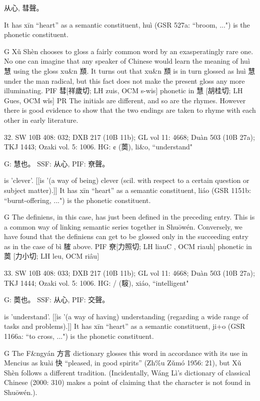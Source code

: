 从心, 彗聲。

It has xīn ``heart'' as a semantic constituent,
huì (GSR 527a: ``broom, ...") is the phonetic constituent.

G Xǔ Shèn chooses to gloss a fairly common word by an exasperatingly rare one. No one can imagine that any speaker of Chinese would learn the meaning of huì 慧 using the gloss xu&n 䫞. It turns out that xu&n 䫞 is in turn glossed as huì 慧 under the man radical, but this fact does not make the present gloss any more illuminating.
PIF    彗[祥歲切; LH zuis, OCM s-wis] phonetic in 慧 [胡桂切; LH Gues, OCM wǐs]
PR The initials are different, and so are the rhymes. However there is good evidence to show that the two endings are taken to rhyme with each other in early literature.

32. SW 10B 408: 032; DXB 217 (10B 11b); GL vol 11: 4668; Duàn 503 (10B 27a); TKJ 1443; Ozaki vol. 5: 1006.
HG: ¢ (䓴), li&o, ``understand"

G:	慧也。
SSF: 从心,
PIF: 尞聲。

is 'clever'. [[is '(a way of being) clever (scil. with respect to a certain question or subject matter).]]
It has xīn ``heart'' as a semantic constituent,
liáo (GSR 1151b: ``burnt-offering, ...") is the phonetic constituent.

G The definiens, in this case, has just been defined in the preceding entry. This is a common way of linking semantic series together in Shuōwén. Conversely, we have found that the definiens can get to be glossed only in the succeeding entry as in the case of bì 䮤 above.
PIF    尞[力照切; LH liauC , OCM riauh] phonetic in 䓴 [力小切; LH leu, OCM riâu]

33. SW 10B 408: 033; DXB 217 (10B 11b); GL vol 11: 4668; Duàn 503 (10B 27a); TKJ 1444; Ozaki vol. 5: 1006.
HG:  / (䮟), xiáo, ``intelligent"

G:	䓴也。
SSF: 从心,
PIF: 交聲。

is 'understand'. [[is '(a way of having) understanding (regarding a wide range of tasks and problems).]]
It has xīn ``heart'' as a semantic constituent,
ji+o (GSR 1166a: ``to cross, ...") is the phonetic constituent.

G   The F&ngyán 方言 dictionary glosses this word in accordance with its use in Mencius as kuài 快 ``pleased, in good spirits'' (Zh\%u Zǔmó 1956: 21), but Xǔ Shèn follows a different tradition. (Incidentally, Wáng Lì's dictionary of classical Chinese (2000: 310) makes a point of claiming that the character is not found in Shuōwén.).



